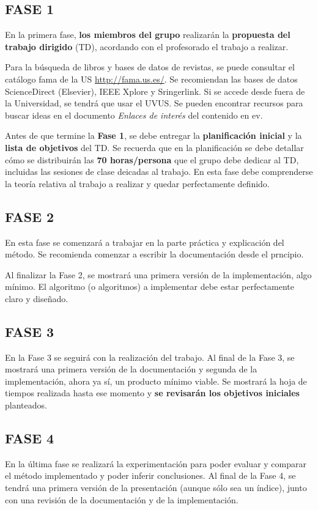 \documentclass[a4paper]{article}
\begin{document}
\subsection*{FASE 1}
En la primera fase, \textbf{los miembros del grupo} realizarán la \textbf{propuesta del trabajo dirigido} (TD), acordando con el profesorado el trabajo a realizar. 

Para la búsqueda de libros y bases de datos de revistas, se puede consultar el catálogo fama de la US \url{http://fama.us.es/}. Se recomiendan las bases de datos ScienceDirect (Elsevier), IEEE Xplore y Sringerlink. Si se accede desde fuera de la Universidad, se tendrá que usar el UVUS. Se pueden encontrar recursos para buscar ideas en el documento \textit{Enlaces de interés} del contenido en ev.

Antes de que termine la \textbf{Fase 1}, se debe entregar la {\bf planificación inicial} y la {\bf lista de objetivos} del TD. Se recuerda que en la planificación se debe detallar cómo se distribuirán las {\bf 70 horas/persona} que el grupo debe dedicar al TD, incluidas las sesiones de clase deicadas al trabajo.  
En esta fase debe comprenderse la teoría relativa al trabajo a realizar y quedar perfectamente definido. 

\subsection*{FASE 2}
En esta fase se comenzará a trabajar en la parte práctica y explicación del método. Se recomienda comenzar a escribir la documentación desde el prncipio.

Al finalizar la Fase 2, se mostrará una primera versión de la implementación, algo mínimo. El algoritmo (o algoritmos) a implementar debe estar perfectamente claro y diseñado. 

\subsection*{FASE 3}
En la Fase 3 se seguirá con la realización del trabajo. Al final de la Fase 3, se mostrará una primera versión de la documentación y segunda de la implementación, ahora ya sí, un producto mínimo viable. Se mostrará la hoja de tiempos realizada hasta ese momento y \textbf{ se revisarán los objetivos iniciales} planteados.

\subsection*{FASE 4}
En la última fase se realizará la experimentación para poder evaluar y comparar el método implementado y poder inferir conclusiones. Al final de la Fase 4, se tendrá una primera versión de la presentación (aunque sólo sea un índice), junto con una revisión de la documentación y de la implementación. 
\end{document}
